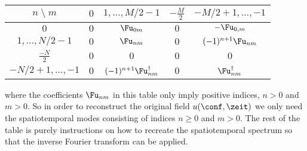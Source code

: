\begin{description}
{\begin{table}[h!]
\centering
\begin{tabular}{|c|c|c|c|c|}
\hline
\quad  $n\;\setminus\; m$
                  & $0$  & $1,\ldots,M/2-1$                & $-\frac{M}{2}$ & $-M/2+1,\ldots,-1$ \\
\hline
$0$               & $0$  & $\Fu_{0m}$                     & $0$            & $-\Fu_{0,m}$        \\
\hline
$1,\ldots,N/2-1$  & $0$  & $\Fu_{nm}$                     & $0$            & $(-1)^{n+1}\Fu_{nm}$ \\
\hline
$\frac{-N}{2}$    & $0$  & $0$                             & $0$            & $0$                 \\
\hline
$-N/2+1,\ldots,-1$ & $0$  & $(-1)^{n+1}\Fu_{nm}^{\dagger}$ & $0$           & $\Fu_{nm}^{\dagger}$ \\
\hline
\end{tabular}
\end{table}
where the coefficients $\Fu_{nm}$ in this table only imply positive indices, $n>0$ and $m>0$. So in order to
reconstruct the original field $u(\conf,\zeit)$ we only need the spatiotemporal modes consisting of indices $ n \geq 0$
and $m > 0$. The rest of the table is purely instructions on how to recreate the spatiotemporal spectrum so that the
inverse Fourier transform can be applied.
}

%


\end{description}
